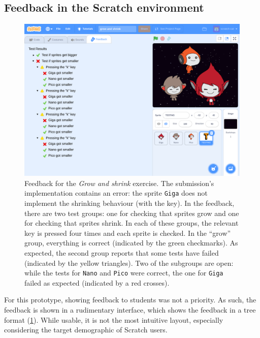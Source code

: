 \documentclass[../main]{subfiles}
\begin{document}
\subsection{Feedback in the Scratch environment}\label{subsec:feedback-in-the-scratch-environment}

\begin{figure}
    \begin{wide}
        \includegraphics[width=\linewidth]{scratch-poke-feedback}
    \end{wide}
    \caption{
        Feedback for the \emph{Grow and shrink} exercise.
        The submission's implementation contains an error: the sprite \texttt{Giga} does not implement the shrinking behaviour (with the  key).
        In the feedback, there are two test groups: one for checking that sprites grow and one for checking that sprites shrink.
        In each of these groups, the relevant key is pressed four times and each sprite is checked.
        In the ``grow'' group, everything is correct (indicated by the green checkmarks).
        As expected, the second group reports that some tests have failed (indicated by the yellow triangles).
        Two of the subgroups are open: while the tests for \texttt{Nano} and \texttt{Pico} were correct, the one for \texttt{Giga} failed as expected (indicated by a red crosses).
    }
    \label{fig:poke-feedback-result}
\end{figure}

For this prototype, showing feedback to students was not a priority.
As such, the feedback is shown in a rudimentary interface, which shows the feedback in a tree format (\cref{fig:poke-feedback-result}).
While usable, it is not the most intuitive layout, especially considering the target demographic of Scratch users.
\end{document}
